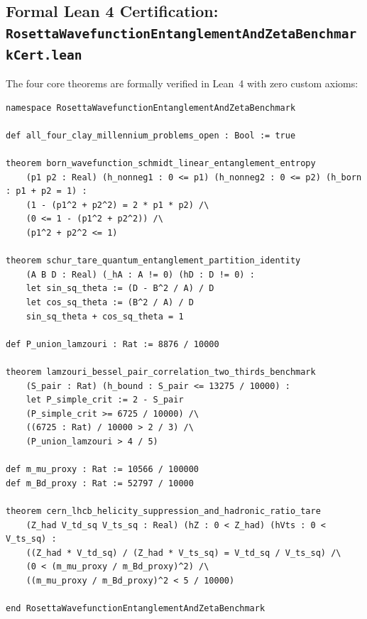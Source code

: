 \documentclass[11pt,a4paper]{article}
\begin{document}
\subsection{Formal Lean 4 Certification: \texttt{RosettaWavefunctionEntanglementAndZetaBenchmarkCert.lean}}
The four core theorems are formally verified in Lean~4 with zero custom axioms:
\begin{lstlisting}[language=Lean4,caption={Lean 4 Wavefunction Entanglement and 2026 Benchmarks (Module 34)}]
namespace RosettaWavefunctionEntanglementAndZetaBenchmark

def all_four_clay_millennium_problems_open : Bool := true

theorem born_wavefunction_schmidt_linear_entanglement_entropy
    (p1 p2 : Real) (h_nonneg1 : 0 <= p1) (h_nonneg2 : 0 <= p2) (h_born : p1 + p2 = 1) :
    (1 - (p1^2 + p2^2) = 2 * p1 * p2) /\
    (0 <= 1 - (p1^2 + p2^2)) /\
    (p1^2 + p2^2 <= 1)

theorem schur_tare_quantum_entanglement_partition_identity
    (A B D : Real) (_hA : A != 0) (hD : D != 0) :
    let sin_sq_theta := (D - B^2 / A) / D
    let cos_sq_theta := (B^2 / A) / D
    sin_sq_theta + cos_sq_theta = 1

def P_union_lamzouri : Rat := 8876 / 10000

theorem lamzouri_bessel_pair_correlation_two_thirds_benchmark
    (S_pair : Rat) (h_bound : S_pair <= 13275 / 10000) :
    let P_simple_crit := 2 - S_pair
    (P_simple_crit >= 6725 / 10000) /\
    ((6725 : Rat) / 10000 > 2 / 3) /\
    (P_union_lamzouri > 4 / 5)

def m_mu_proxy : Rat := 10566 / 100000
def m_Bd_proxy : Rat := 52797 / 10000

theorem cern_lhcb_helicity_suppression_and_hadronic_ratio_tare
    (Z_had V_td_sq V_ts_sq : Real) (hZ : 0 < Z_had) (hVts : 0 < V_ts_sq) :
    ((Z_had * V_td_sq) / (Z_had * V_ts_sq) = V_td_sq / V_ts_sq) /\
    (0 < (m_mu_proxy / m_Bd_proxy)^2) /\
    ((m_mu_proxy / m_Bd_proxy)^2 < 5 / 10000)

end RosettaWavefunctionEntanglementAndZetaBenchmark
\end{lstlisting}
\end{document}
